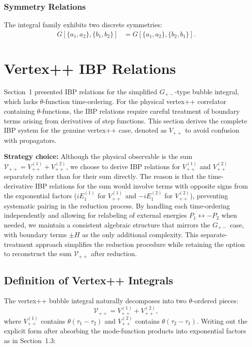 \documentclass[a4paper,12pt]{article}
\begin{document}
\subsubsection{Symmetry Relations}
The integral family exhibits two discrete symmetries:
\begin{align}
	G[\{a_1,a_2\},\{b_1,b_2\}] & = G[\{a_1,a_2\},\{b_2,b_1\}].
\end{align}



\newpage

\section{Vertex++ IBP Relations}

Section~1 presented IBP relations for the simplified $G_{+-}$-type bubble integral, which lacks $\theta$-function time-ordering. For the physical vertex++ correlator containing $\theta$-functions, the IBP relations require careful treatment of boundary terms arising from derivatives of step functions. This section derives the complete IBP system for the genuine vertex++ case, denoted as $V_{++}$ to avoid confusion with propagators.

\textbf{Strategy choice:} Although the physical observable is the sum $\mathcal{V}_{++} = V_{++}^{(1)} + V_{++}^{(2)}$, we choose to derive IBP relations for $V_{++}^{(1)}$ and $V_{++}^{(2)}$ separately rather than for their sum directly. The reason is that the time-derivative IBP relations for the sum would involve terms with opposite signs from the exponential factors ($iE_1^{(1)}$ for $V_{++}^{(1)}$ and $-iE_1^{(2)}$ for $V_{++}^{(2)}$), preventing systematic pairing in the reduction process. By handling each time-ordering independently and allowing for relabeling of external energies $P_1\leftrightarrow -P_2$ when needed, we maintain a consistent algebraic structure that mirrors the $G_{+-}$ case, with boundary terms $\pm H$ as the only additional complexity. This separate-treatment approach simplifies the reduction procedure while retaining the option to reconstruct the sum $\mathcal{V}_{++}$ after reduction.

\subsection{Definition of Vertex++ Integrals}

The vertex++ bubble integral naturally decomposes into two $\theta$-ordered pieces:
\begin{equation}
	\mathcal{V}_{++} = V_{++}^{(1)} + V_{++}^{(2)},
\end{equation}
where $V_{++}^{(1)}$ contains $\theta(\tau_1-\tau_2)$ and $V_{++}^{(2)}$ contains $\theta(\tau_2-\tau_1)$. Writing out the explicit form after absorbing the mode-function products into exponential factors as in Section~1.3:
\end{document}
